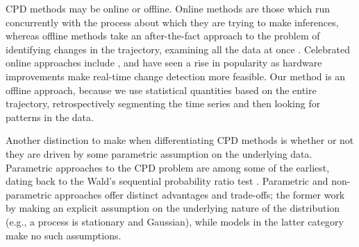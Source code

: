 \documentclass{article}
\begin{document}
CPD methods may be online or offline. Online methods are those which run concurrently with the process about which they are trying to make inferences, whereas offline methods take an after-the-fact approach to the problem of identifying changes in the trajectory, examining all the data at once \cite{pageCONTINUOUSINSPECTIONSCHEMES1954,picardTestingEstimatingChangepoints1985}.  Celebrated online approaches include \cite{adamsBayesianOnlineChangepoint2007, jacksonAlgorithmOptimalPartitioning2005, OnlineAlgorithmSegmenting}, and have seen a rise in popularity as hardware improvements make real-time change detection more feasible. Our method is an offline approach, because we use statistical quantities based on the entire trajectory, retrospectively segmenting the time series and then looking for patterns in the data.


Another distinction to make when differentiating CPD methods is whether or not they are driven by some parametric assumption on the underlying data. Parametric approaches to the CPD problem are among some of the earliest, dating back to the Wald's sequential probability ratio test \cite{waldSequentialTestsStatistical1945}. Parametric and non-parametric approaches offer distinct advantages and trade-offs; the former work by making an explicit assumption on the underlying nature of the distribution (e.g., a process is stationary and Gaussian), while models in the latter category make no such assumptions. 
\end{document}
